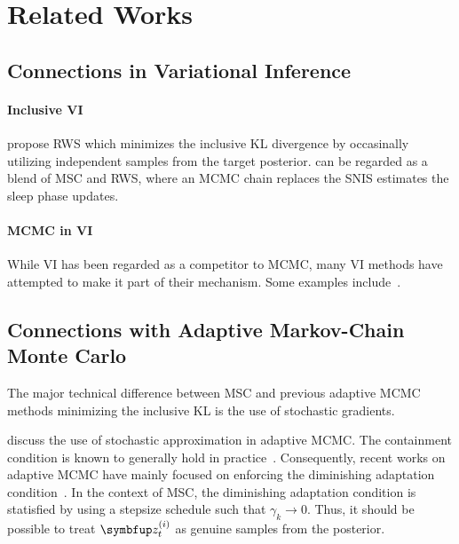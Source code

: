 
\section{Related Works}
\subsection{Connections in Variational Inference}
\paragraph{Inclusive VI}
\citet{DBLP:journals/corr/BornscheinB14} propose RWS which minimizes the inclusive KL divergence by occasinally utilizing independent samples from the target posterior.
\citep{kim2021adaptive} can be regarded as a blend of MSC and RWS, where an MCMC chain replaces the SNIS estimates the sleep phase updates.

\paragraph{MCMC in VI}
While VI has been regarded as a competitor to MCMC, many VI methods have attempted to make it part of their mechanism.
Some examples include~\citep{pmlr-v97-ruiz19a}.


\subsection{Connections with Adaptive Markov-Chain Monte Carlo}
The major technical difference between MSC and previous adaptive MCMC methods minimizing the inclusive KL is the use of stochastic gradients.

\citet{10.1007/s11222-008-9110-y, garthwaite_adaptive_2016} discuss the use of stochastic approximation in adaptive MCMC.
The containment condition is known to generally hold in practice~\citep{rosenthal_optimal_, bai_containment_2011}.
Consequently, recent works on adaptive MCMC have mainly focused on enforcing the diminishing adaptation condition~\citep{wang_adaptive_2013}.
In the context of MSC, the diminishing adaptation condition is statisfied by using a stepsize schedule such that \(\gamma_k \rightarrow 0\).
Thus, it should be possible to treat \(\vz^{(i)}_t\) as genuine samples from the posterior.


